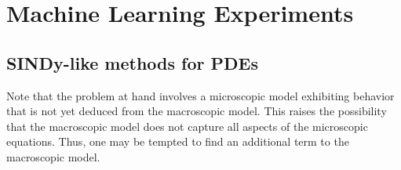 \documentclass[12pt]{article}
\numberwithin{equation}{section}
\begin{document}
\section{Machine Learning Experiments}
\subsection{SINDy-like methods for PDEs}
\par Note that the problem at hand involves a microscopic model exhibiting behavior that is not yet deduced from the macroscopic model. This raises the possibility that the macroscopic model does not capture all aspects of the microscopic equations. Thus, one may be tempted to find an additional term to the macroscopic model. 
\end{document}
